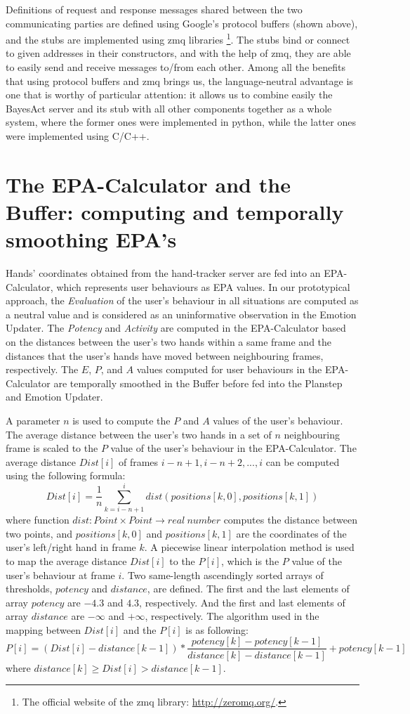 Definitions of request and response messages shared between the two communicating parties are defined using Google's protocol buffers (shown above), and the stubs are implemented using zmq libraries \footnote{The official website of the zmq library: \url{http://zeromq.org/}.}. The stubs bind or connect to given addresses in their constructors, and with the help of zmq, they are able to easily send and receive messages to/from each other. Among all the benefits that using protocol buffers and zmq brings us, the language-neutral advantage is one that is worthy of particular attention: it allows us to combine easily the BayesAct server and its stub with all other components together as a whole system, where the former ones were implemented in python, while the latter ones were implemented using C/C++.


\section{The EPA-Calculator and the Buffer: computing and temporally smoothing EPA's}

Hands' coordinates obtained from the hand-tracker server are fed into an EPA-Calculator, which represents user behaviours as EPA values. In our prototypical approach, the \textit{Evaluation} of the user's behaviour in all situations are computed as a neutral value and is considered as an uninformative observation in the Emotion Updater. The \textit{Potency} and \textit{Activity} are computed in the EPA-Calculator based on the distances between the user's two hands within a same frame and the distances that the user's hands have moved between neighbouring frames, respectively. The $E$, $P$, and $A$ values computed for user behaviours in the EPA-Calculator are temporally smoothed in the Buffer before fed into the Planstep and Emotion Updater.

A parameter $n$ is used to compute the $P$ and $A$ values of the user's behaviour. The average distance between the user's two hands in a set of $n$ neighbouring frame is scaled to the $P$ value of the user's behaviour in the EPA-Calculator. The average distance $Dist[i]$ of frames $i-n+1, i-n+2, ... , i$ can be computed using the following formula:
$$Dist[i]=\dfrac{1}{n} \sum_{k=i-n+1}^{i}dist(positions[k,0],positions[k,1])$$
where function $dist: Point \times Point \to real\ number$ computes the distance between two points, and $positions[k,0]$ and $positions[k,1]$ are the coordinates of the user's left/right hand in frame $k$. A piecewise linear interpolation method is used to map the average distance $Dist[i]$ to the $P[i]$, which is the $P$ value of the user's behaviour at frame $i$. Two same-length ascendingly sorted arrays of thresholds, $potency$ and $distance$, are defined. The first and the last elements of array $potency$ are $-4.3$ and $4.3$, respectively. And the first and last elements of array $distance$ are $-\infty$ and $+\infty$, respectively. The algorithm used in the mapping between $Dist[i]$ and the $P[i]$ is as following:
$$P[i]=(Dist[i]-distance[k-1]) * \dfrac{potency[k]-potency[k-1]}{distance[k]-distance[k-1]} + potency[k-1]$$
where $distance[k] \geq Dist[i]>distance[k-1]$.

